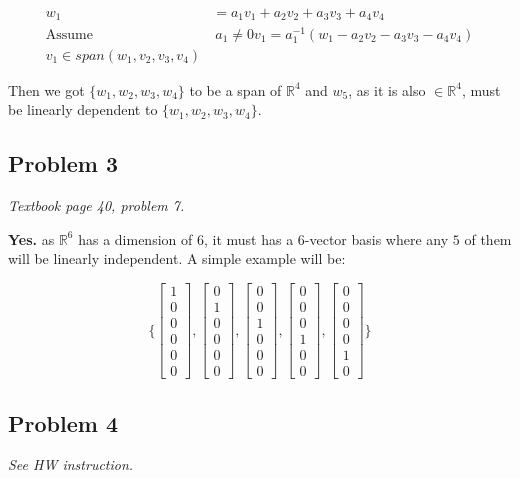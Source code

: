 \documentclass[11pt]{article}
\providecommand{\qbm}[1]{\begin{bmatrix} #1 \end{bmatrix}}
\begin{document}
\begin{align*}
    w_1 &= a_1 v_1 + a_2 v_2 + a_3 v_3 + a_4 v_4 \\
    \text{Assume}& \ a_1 \neq 0
    v_1 = a^{-1}_1 (w_1 - a_2 v_2 - a_3 v_3 - a_4 v_4) \\
    v_1 \in span(w_1, v_2, v_3, v_4)
\end{align*}

Then we got $\{w_1, w_2, w_3, w_4\}$ to be a span of $\mathbb{R}^4$ and $w_5$, as it is also $\in \mathbb{R}^4$, must be linearly dependent to  $\{w_1, w_2, w_3, w_4\}$.




\subsection*{Problem 3}
\textit{Textbook page 40, problem 7.}\newline

\textbf{Yes.} as $\mathbb{R}^6$ has a dimension of $6$, it must has a 6-vector basis where any $5$ of them will be linearly independent. A simple example will be:

\begin{equation*}
    \Big \{ \qbm{1 \\ 0 \\ 0 \\ 0 \\ 0 \\ 0}, \qbm{0 \\ 1 \\ 0 \\ 0 \\ 0 \\ 0}, \qbm{0 \\ 0 \\ 1 \\ 0 \\ 0 \\ 0}, \qbm{0 \\ 0 \\ 0 \\ 1 \\ 0 \\ 0}, \qbm{0 \\ 0 \\ 0 \\ 0 \\ 1 \\ 0} \Big \}
\end{equation*}




\subsection*{Problem 4}
\textit{See HW instruction.}\newline
\end{document}
